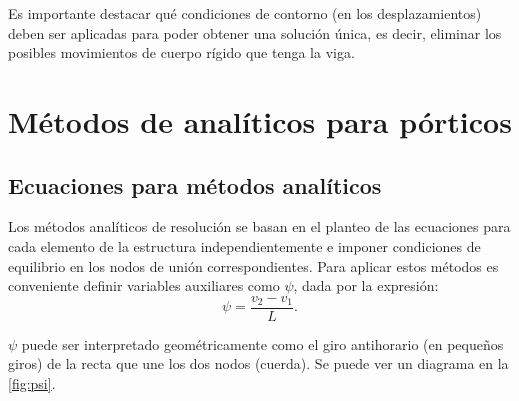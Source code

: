 %
Es importante destacar qué condiciones de contorno (en los desplazamientos) deben ser aplicadas para poder obtener una solución única, es decir, eliminar los posibles movimientos de cuerpo rígido que tenga la viga.







%



\section{Métodos de analíticos para pórticos}


\subsection{Ecuaciones para métodos analíticos}

Los métodos analíticos de resolución se basan en el planteo de las ecuaciones para cada elemento de la estructura independientemente e imponer condiciones de equilibrio en los nodos de unión correspondientes. %
%
Para aplicar estos métodos es conveniente definir variables auxiliares como $\psi$, dada por la expresión:
%
\begin{equation}
  \psi = \frac{v_2 - v_1}{L}.
\end{equation}
%

$\psi$ puede ser interpretado geométricamente como el giro antihorario (en pequeños giros) de la recta que une los dos nodos (cuerda). Se puede ver un diagrama en la \autoref{fig:psi}.

